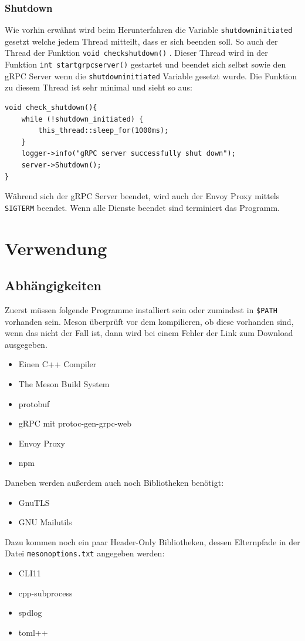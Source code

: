 \documentclass[12pt]{article}
\def\code#1{\texttt{#1}}
\begin{document}
\subsubsection{Shutdown}
Wie vorhin erwähnt wird beim Herunterfahren die Variable 
\code{shutdown\textunderscore initiated} gesetzt welche jedem Thread mitteilt, 
dass er sich beenden soll. So auch der Thread der Funktion 
\code{void check\textunderscore shutdown()} . Dieser Thread wird in der 
Funktion \code{int start\textunderscore grpc\textunderscore server()} gestartet
und beendet sich selbst sowie den gRPC Server wenn die 
\code{shutdown\textunderscore initiated} Variable gesetzt wurde. Die Funktion
zu diesem Thread ist sehr minimal und sieht so aus:
\newpage
\begin{verbatim}
void check_shutdown(){
    while (!shutdown_initiated) {
        this_thread::sleep_for(1000ms);
    }
    logger->info("gRPC server successfully shut down");
    server->Shutdown();
}
\end{verbatim}
Während sich der gRPC Server beendet, wird auch der Envoy Proxy mittels 
\code{SIGTERM} beendet. Wenn alle Dienste beendet sind terminiert das Programm.

\section{Verwendung}
\subsection{Abhängigkeiten}
Zuerst müssen folgende Programme installiert sein oder zumindest in 
\code{\$PATH} vorhanden sein. Meson überprüft vor dem kompilieren, ob diese 
vorhanden sind, wenn das nicht der Fall ist, dann wird bei einem Fehler der 
Link zum Download ausgegeben.
\begin{itemize}
    \item Einen C++ Compiler
    \item The Meson Build System \cite{meson}
    \item protobuf \cite{protobuf}
    \item gRPC mit protoc-gen-grpc-web \cite{protoc-gen-grpc-web}
    \item Envoy Proxy \cite{envoy}
    \item npm \cite{npm}
\end{itemize}
Daneben werden außerdem auch noch  Bibliotheken benötigt:
\begin{itemize}
    \item GnuTLS \cite{gnutls}
    \item GNU Mailutils \cite{mailutils}
\end{itemize}
\newpage
Dazu kommen noch ein paar Header-Only Bibliotheken, dessen Elternpfade in der 
Datei \code{meson\textunderscore options.txt} angegeben werden:
\begin{itemize}
    \item CLI11 \cite{cli11}
    \item cpp-subprocess \cite{cpp-subprocess}
    \item spdlog \cite{spdlog}
    \item toml++ \cite{toml}
\end{itemize}
\end{document}
